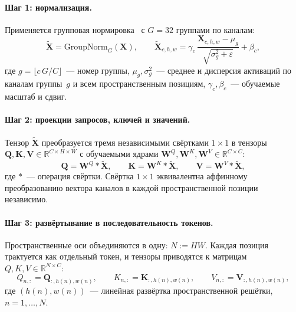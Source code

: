 \paragraph{Шаг 1: нормализация.}
Применяется групповая нормировка~\cite{wu2018group} с $G=32$ группами по каналам:
\begin{equation}
    \tilde{\mathbf{X}} = \mathrm{GroupNorm}_{G}(\mathbf{X}), \qquad
    \tilde{\mathbf{X}}_{c,h,w} = \gamma_c\,\frac{\mathbf{X}_{c,h,w}-\mu_g}{\sqrt{\sigma_g^2+\varepsilon}} + \beta_c,
    \label{eq:groupnorm}
\end{equation}
где $g=\lfloor c\,G/C\rfloor$~--- номер группы, $\mu_g,\sigma_g^2$~--- среднее и дисперсия активаций по каналам группы~$g$ и всем пространственным позициям, $\gamma_c,\beta_c$~--- обучаемые масштаб и сдвиг.

\paragraph{Шаг 2: проекции запросов, ключей и значений.}
Тензор $\tilde{\mathbf{X}}$ преобразуется тремя независимыми свёртками $1\times1$ в тензоры $\mathbf{Q},\mathbf{K},\mathbf{V}\in\mathbb{R}^{C\times H\times W}$ с обучаемыми ядрами $\mathbf{W}^Q,\mathbf{W}^K,\mathbf{W}^V\in\mathbb{R}^{C\times C}$:
\begin{equation}
    \mathbf{Q} = \mathbf{W}^Q\!\ast\tilde{\mathbf{X}}, \qquad
    \mathbf{K} = \mathbf{W}^K\!\ast\tilde{\mathbf{X}}, \qquad
    \mathbf{V} = \mathbf{W}^V\!\ast\tilde{\mathbf{X}},
    \label{eq:qkv_proj}
\end{equation}
где $\ast$~--- операция свёртки. Свёртка $1\times1$ эквивалентна аффинному преобразованию вектора каналов в каждой пространственной позиции независимо.

\paragraph{Шаг 3: развёртывание в последовательность токенов.}
Пространственные оси объединяются в одну: $N := HW$. Каждая позиция трактуется как отдельный токен, и тензоры приводятся к матрицам $Q,K,V\in\mathbb{R}^{N\times C}$:
\begin{equation}
    Q_{n,:} = \mathbf{Q}_{:,h(n),w(n)}, \qquad
    K_{n,:} = \mathbf{K}_{:,h(n),w(n)}, \qquad
    V_{n,:} = \mathbf{V}_{:,h(n),w(n)},
    \label{eq:flatten}
\end{equation}
где $(h(n),w(n))$~--- линейная развёртка пространственной решётки, $n=1,\ldots,N$.

